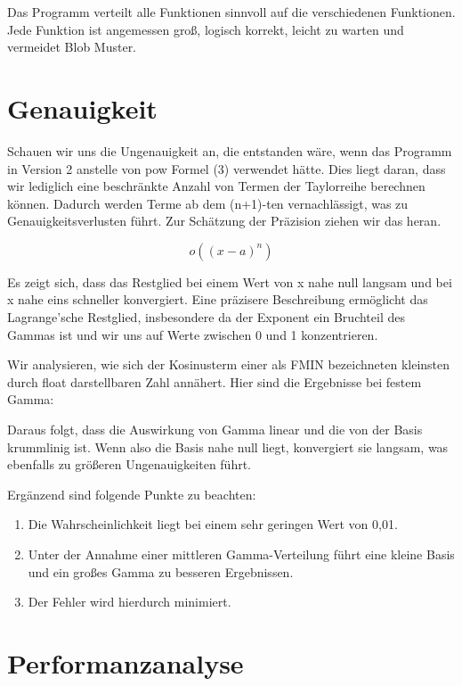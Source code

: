 \documentclass[course=erap]{aspdoc}
\begin{document}
\par
Das Programm verteilt alle Funktionen sinnvoll auf die verschiedenen Funktionen. Jede Funktion ist angemessen groß, logisch korrekt, leicht zu warten und vermeidet Blob Muster.

\section{Genauigkeit}

\par
Schauen wir uns die Ungenauigkeit an, die entstanden wäre, wenn das Programm in Version 2 anstelle von pow Formel (3) verwendet hätte. Dies liegt daran, dass wir lediglich eine beschränkte Anzahl von Termen der Taylorreihe berechnen können. Dadurch werden Terme ab dem (n+1)-ten vernachlässigt, was zu Genauigkeitsverlusten führt. Zur Schätzung der Präzision ziehen wir das  heran.

\[
o\left((x-a)^n\right)
\]

\par
Es zeigt sich, dass das Restglied bei einem Wert von x nahe null langsam und bei x nahe eins schneller konvergiert. Eine präzisere Beschreibung ermöglicht das Lagrange'sche Restglied, insbesondere da der Exponent ein Bruchteil des Gammas ist und wir uns auf Werte zwischen 0 und 1 konzentrieren.

\par
Wir analysieren, wie sich der Kosinusterm einer als FMIN bezeichneten kleinsten durch float darstellbaren Zahl annähert. Hier sind die Ergebnisse bei festem Gamma:

\par
Daraus folgt, dass die Auswirkung von Gamma linear und die von der Basis krummlinig ist. Wenn also die Basis nahe null liegt, konvergiert sie langsam, was ebenfalls zu größeren Ungenauigkeiten führt.

\par
Ergänzend sind folgende Punkte zu beachten:
\begin{enumerate}
\item Die Wahrscheinlichkeit liegt bei einem sehr geringen Wert von 0,01.
\item Unter der Annahme einer mittleren Gamma-Verteilung führt eine kleine Basis und ein großes Gamma zu besseren Ergebnissen.
\item Der Fehler wird hierdurch minimiert.
\end{enumerate}

\section{Performanzanalyse}
\end{document}
